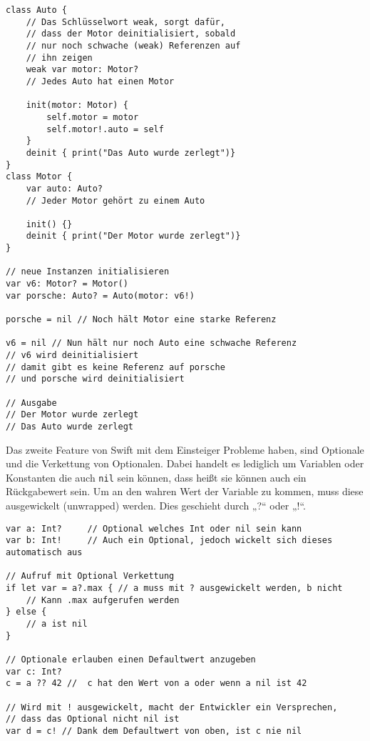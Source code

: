 \begin{lstlisting}
class Auto {
    // Das Schlüsselwort weak, sorgt dafür,
    // dass der Motor deinitialisiert, sobald
    // nur noch schwache (weak) Referenzen auf
    // ihn zeigen
    weak var motor: Motor? 
    // Jedes Auto hat einen Motor
    
    init(motor: Motor) {
        self.motor = motor
        self.motor!.auto = self
    }
    deinit { print("Das Auto wurde zerlegt")}
}
class Motor {
    var auto: Auto? 
    // Jeder Motor gehört zu einem Auto
    
    init() {}
    deinit { print("Der Motor wurde zerlegt")}
}

// neue Instanzen initialisieren
var v6: Motor? = Motor()
var porsche: Auto? = Auto(motor: v6!)

porsche = nil // Noch hält Motor eine starke Referenz

v6 = nil // Nun hält nur noch Auto eine schwache Referenz
// v6 wird deinitialisiert
// damit gibt es keine Referenz auf porsche
// und porsche wird deinitialisiert

// Ausgabe
// Der Motor wurde zerlegt
// Das Auto wurde zerlegt
\end{lstlisting}
Das zweite Feature von Swift mit dem Einsteiger Probleme haben, sind Optionale und die Verkettung von Optionalen. Dabei handelt es lediglich um Variablen oder Konstanten die auch \lstinline{nil} sein können, dass heißt sie können auch ein Rückgabewert sein. Um an den wahren Wert der Variable zu kommen, muss diese ausgewickelt (unwrapped) werden. Dies geschieht durch „?“ oder „!“. 
\begin{lstlisting}
var a: Int? 	// Optional welches Int oder nil sein kann
var b: Int! 	// Auch ein Optional, jedoch wickelt sich dieses automatisch aus

// Aufruf mit Optional Verkettung
if let var = a?.max { // a muss mit ? ausgewickelt werden, b nicht
	// Kann .max aufgerufen werden
} else {
	// a ist nil
}

// Optionale erlauben einen Defaultwert anzugeben
var c: Int?
c = a ?? 42 //  c hat den Wert von a oder wenn a nil ist 42

// Wird mit ! ausgewickelt, macht der Entwickler ein Versprechen,
// dass das Optional nicht nil ist
var d = c! // Dank dem Defaultwert von oben, ist c nie nil
\end{lstlisting}
